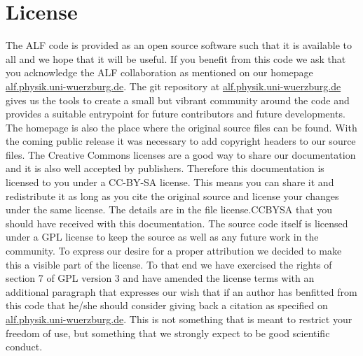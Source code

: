 
\section*{License}

The  ALF code  is provided as an open source software  such that it is  available  to all and we  hope that  it 
will be useful.  If you benefit from this code  we ask that you acknowledge  the ALF collaboration  as mentioned on our
homepage \url{alf.physik.uni-wuerzburg.de}.   The git repository at   \url{alf.physik.uni-wuerzburg.de} gives us the tools to 
create a small but vibrant community around the code and provides a suitable entrypoint for future contributors  and future developments. 
The homepage is also the place where the original source files can be found.
With the coming public release it was necessary to add copyright headers to our source files.
The Creative Commons licenses are a good way to share our documentation and it is also well 
accepted by publishers. Therefore this documentation is licensed to you under a CC-BY-SA license.
This means you can share it and redistribute it as long as you cite the original source and
license your changes under the same license. The details are in the file license.CCBYSA that you should have received with this documentation.
The source code itself is licensed under a GPL license to keep the source as well as any future work in the community.
To express our desire for a proper attribution we decided to make this a visible part of the license.
To that end we have exercised the rights of section 7 of GPL version 3 and have amended
the license terms with an additional paragraph that expresses our wish that if an author has benfitted from this code
that he/she should consider giving back a citation as specified on \url{alf.physik.uni-wuerzburg.de}.
This is not something that is meant to restrict your freedom of use, but something that we strongly expect to be good scientific conduct.

